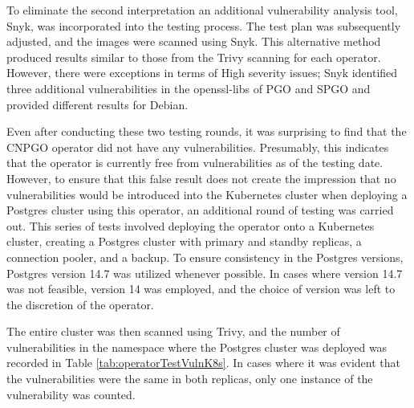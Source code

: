 To eliminate the second interpretation an additional vulnerability analysis tool, Snyk, was incorporated into the testing process. The test plan was subsequently adjusted, and the images were scanned using Snyk. This alternative method produced results similar to those from the Trivy scanning for each operator. However, there were exceptions in terms of High severity issues;
Snyk identified three additional vulnerabilities in the openssl-libs of PGO and SPGO and provided different results for Debian.


Even after conducting these two testing rounds, it was surprising to find that the CNPGO operator did not have any vulnerabilities. Presumably, this indicates that the operator is currently free from vulnerabilities as of the testing date. However, to ensure that this false result does not create the impression that no vulnerabilities would be introduced into the Kubernetes cluster when deploying a Postgres cluster using this operator, an additional round of testing was carried out. This series of tests involved deploying the operator onto a Kubernetes cluster, creating a Postgres cluster with primary and standby replicas, a connection pooler, and a backup.
To ensure consistency in the Postgres versions, Postgres version 14.7 was utilized whenever possible. In cases where version 14.7 was not feasible, version 14 was employed, and the choice of version was left to the discretion of the operator.

The entire cluster was then scanned using Trivy, and the number of vulnerabilities in the namespace where the Postgres cluster was deployed was recorded in Table \ref{tab:operatorTestVulnK8s}. In cases where it was evident that the vulnerabilities were the same in both replicas, only one instance of the vulnerability was counted.

